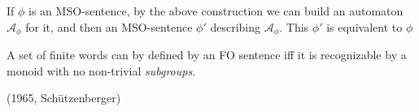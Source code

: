 \begin{remark}
	If $\phi$ is an MSO-sentence, by the above construction we can build
	an automaton $\mathcal{A}_{\phi}$ for it, and then
	an MSO-sentence  $\phi'$ describing $\mathcal{A}_{\phi}$.
	This $\phi'$ is equivalent to $\phi$ 
\end{remark}

\begin{theorem}
	A set of finite words can by defined by an FO sentence
	iff it is recognizable by a monoid with no non-trivial \emph{subgroups}.
	\begin{flushright}
		(1965, Schützenberger)
	\end{flushright}
\end{theorem}


